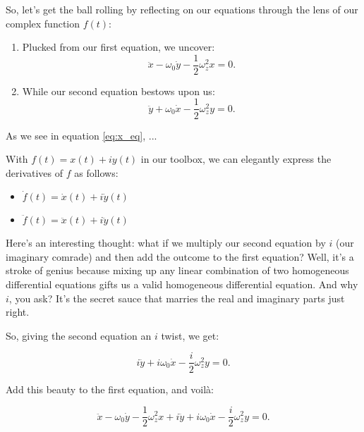 \documentclass{article}
\begin{document}
So, let's get the ball rolling by reflecting on our equations through the lens of our complex function \(f(t)\):

\begin{enumerate}
    \item Plucked from our first equation, we uncover:
    \begin{equation}
    \label{eq:x_eq} %
    \ddot{x} - \omega_0 \dot{y} - \frac{1}{2}\omega_z^2 x = 0.
    \end{equation}

    \item While our second equation bestows upon us:
    \begin{equation}
    \label{eq:y_eq} %
    \ddot{y} + \omega_0 \dot{x} - \frac{1}{2}\omega_z^2 y = 0.
    \end{equation}
\end{enumerate}

As we see in equation \ref{eq:x_eq}, ...


With \(f(t) = x(t) + iy(t)\) in our toolbox, we can elegantly express the derivatives of \(f\) as follows:

\begin{itemize}
    \item \( \dot{f}(t) = \dot{x}(t) + i\dot{y}(t) \)
    \item \( \ddot{f}(t) = \ddot{x}(t) + i\ddot{y}(t) \)
\end{itemize}

Here's an interesting thought: what if we multiply our second equation by \(i\) (our imaginary comrade) and then add the outcome to the first equation? Well, it's a stroke of genius because mixing up any linear combination of two homogeneous differential equations gifts us a valid homogeneous differential equation. And why \(i\), you ask? It's the secret sauce that marries the real and imaginary parts just right.

So, giving the second equation an \(i\) twist, we get:

\begin{equation}
i\ddot{y} + i\omega_0 \dot{x} - \frac{i}{2}\omega_z^2 y = 0.
\end{equation}

Add this beauty to the first equation, and voilà:

\begin{equation}
\ddot{x} - \omega_0 \dot{y} - \frac{1}{2}\omega_z^2 x + i\ddot{y} + i\omega_0 \dot{x} - \frac{i}{2}\omega_z^2 y = 0.
\end{equation}
\end{document}
